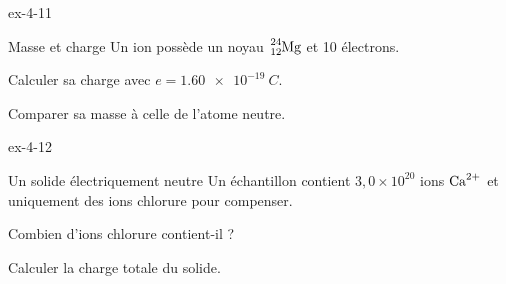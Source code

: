 \begin{blocLivre}{ex-4-11}\begin{exercice}[3]{Masse et charge}
Un ion possède un noyau $\ce{^{24}_{12}Mg}$ et 10 électrons.
\begin{questions}
\item Calculer sa charge avec $e=\qty{1,60e-19}{C}$.
\item Comparer sa masse à celle de l’atome neutre.
\end{questions}
\end{exercice}\end{blocLivre}
\begin{blocLivre}{ex-4-12}\begin{exercice}[3]{Un solide électriquement neutre}
Un échantillon contient $3,0\times10^{20}$ ions $\ce{Ca^{2+}}$ et uniquement des ions chlorure pour compenser.
\begin{questions}
\item Combien d’ions chlorure contient-il ?
\item Calculer la charge totale du solide.
\end{questions}
\end{exercice}\end{blocLivre}

